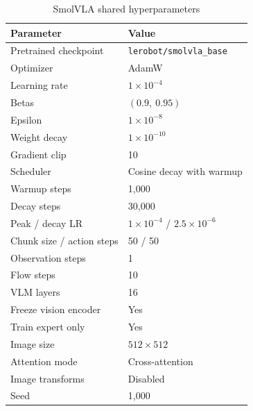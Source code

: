 \documentclass[conference]{IEEEtran}
\begin{document}
\begin{minipage}[b]{0.48\linewidth}
    \begin{table}[H]
    \centering
    \caption{SmolVLA shared hyperparameters}
    \label{tab:smolvla_hyperparams}
    \begin{tabular}{ll}
    \toprule
    \textbf{Parameter} & \textbf{Value} \\
    \midrule
    Pretrained checkpoint & \texttt{lerobot/smolvla\_base} \\
    Optimizer & AdamW \\
    Learning rate & $1\times10^{-4}$ \\
    Betas & $(0.9,\ 0.95)$ \\
    Epsilon & $1\times10^{-8}$ \\
    Weight decay & $1\times10^{-10}$ \\
    Gradient clip & 10 \\
    Scheduler & Cosine decay with warmup \\
    Warmup steps & 1{,}000 \\
    Decay steps & 30{,}000 \\
    Peak / decay LR & $1\times10^{-4}$ / $2.5\times10^{-6}$ \\
    Chunk size / action steps & 50 / 50 \\
    Observation steps & 1 \\
    Flow steps & 10 \\
    VLM layers & 16 \\
    Freeze vision encoder & Yes \\
    Train expert only & Yes \\
    Image size & $512\times512$ \\
    Attention mode & Cross-attention \\
    Image transforms & Disabled \\
    Seed & 1{,}000 \\
    \bottomrule
    \end{tabular}
    \end{table}
\end{minipage}
\end{document}
